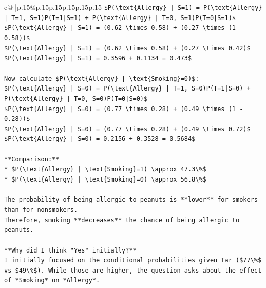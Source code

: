 \documentclass{article}
\begin{document}
{\begin{supertabular}{c@{$\;$}|p{.15\linewidth}@{}p{.15\linewidth}p{.15\linewidth}p{.15\linewidth}p{.15\linewidth}p{.15\linewidth}}
{{{\texttt{\$P(\textbackslash{}text\{Allergy\} | S=1) = P(\textbackslash{}text\{Allergy\} | T=1, S=1)P(T=1|S=1) + P(\textbackslash{}text\{Allergy\} | T=0, S=1)P(T=0|S=1)\$} \\
\texttt{\$P(\textbackslash{}text\{Allergy\} | S=1) = (0.62 \textbackslash{}times 0.58) + (0.27 \textbackslash{}times (1 {-} 0.58))\$} \\
\texttt{\$P(\textbackslash{}text\{Allergy\} | S=1) = (0.62 \textbackslash{}times 0.58) + (0.27 \textbackslash{}times 0.42)\$} \\
\texttt{\$P(\textbackslash{}text\{Allergy\} | S=1) = 0.3596 + 0.1134 = 0.473\$} \\
\\ 
\texttt{Now calculate \$P(\textbackslash{}text\{Allergy\} | \textbackslash{}text\{Smoking\}=0)\$:} \\
\texttt{\$P(\textbackslash{}text\{Allergy\} | S=0) = P(\textbackslash{}text\{Allergy\} | T=1, S=0)P(T=1|S=0) + P(\textbackslash{}text\{Allergy\} | T=0, S=0)P(T=0|S=0)\$} \\
\texttt{\$P(\textbackslash{}text\{Allergy\} | S=0) = (0.77 \textbackslash{}times 0.28) + (0.49 \textbackslash{}times (1 {-} 0.28))\$} \\
\texttt{\$P(\textbackslash{}text\{Allergy\} | S=0) = (0.77 \textbackslash{}times 0.28) + (0.49 \textbackslash{}times 0.72)\$} \\
\texttt{\$P(\textbackslash{}text\{Allergy\} | S=0) = 0.2156 + 0.3528 = 0.5684\$} \\
\\ 
\texttt{**Comparison:**} \\
\texttt{*   \$P(\textbackslash{}text\{Allergy\} | \textbackslash{}text\{Smoking\}=1) \textbackslash{}approx 47.3\textbackslash{}\%\$} \\
\texttt{*   \$P(\textbackslash{}text\{Allergy\} | \textbackslash{}text\{Smoking\}=0) \textbackslash{}approx 56.8\textbackslash{}\%\$} \\
\\ 
\texttt{The probability of being allergic to peanuts is **lower** for smokers than for nonsmokers.} \\
\texttt{Therefore, smoking **decreases** the chance of being allergic to peanuts.} \\
\\ 
\texttt{**Why did I think "Yes" initially?**} \\
\texttt{I initially focused on the conditional probabilities given Tar (\$77\textbackslash{}\%\$ vs \$49\textbackslash{}\%\$). While those are higher, the question asks about the effect of *Smoking* on *Allergy*.} \\
}}}
\end{supertabular}}
\end{document}
